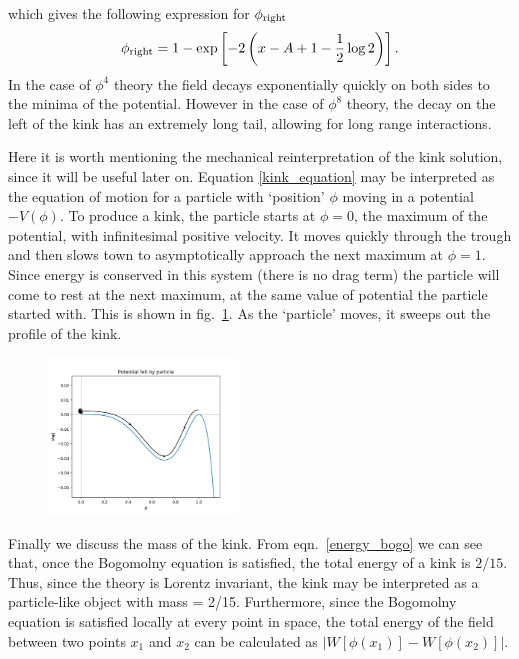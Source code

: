 \documentclass[11pt, oneside]{article}  	%
\numberwithin{equation}{section}
\begin{document}
 which gives the following expression for $\phi_{\textup{right}}$
 \begin{equation}
 \phi_{\textup{right}} = 1- \exp\left [ -2\left ( x - A + 1 - \frac{1}{2}\log2 \right ) \right ].
 \end{equation}
 In the case of $\phi^4$ theory the field decays exponentially quickly on both sides to the minima of the potential. However in the case of $\phi^8$ theory, the decay on the left of the kink has an extremely long tail, allowing for long range interactions.\par
 Here it is worth mentioning the mechanical reinterpretation of the kink solution, since it will be useful later on. Equation \ref{kink_equation} may be interpreted as the equation of motion for a particle with `position' $\phi$ moving in a potential $-V(\phi)$. To produce a kink, the particle starts at $\phi = 0$, the maximum of the potential, with infinitesimal positive velocity. It moves quickly through the trough and then slows town to asymptotically approach the next maximum at $\phi = 1$. Since energy is conserved in this system (there is no drag term) the particle will come to rest at the next maximum, at the same value of potential the particle started with. This is shown in fig.~\ref{mech}. As the `particle' moves, it sweeps out the profile of the kink.\par
 \begin{figure}
\centering
 \includegraphics[width=0.45\textwidth]{mech_kink.png}
  \label{mech}
\end{figure} 
 Finally we discuss the mass of the kink. From eqn.~\ref{energy_bogo} we can see that, once the Bogomolny equation is satisfied, the total energy of a kink is $2/15$. Thus, since the theory is Lorentz invariant, the kink may be interpreted as a particle-like object with mass = 2/15. Furthermore, since the Bogomolny equation is satisfied locally at every point in space, the total energy of the field between two points $x_1$ and $x_2$ can be calculated as $\left | W\left [ \phi(x_1)\right ] - W\left [ \phi(x_2)\right ]\right |$.
 
\end{document}
